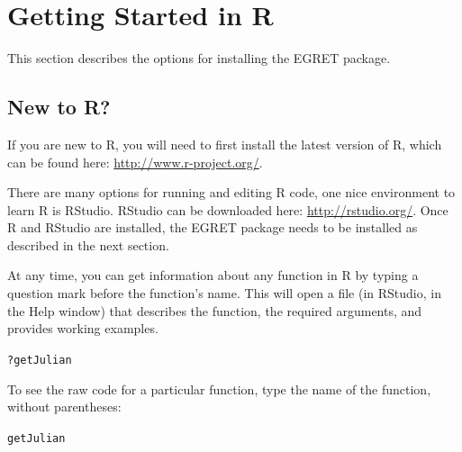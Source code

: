 \documentclass[a4paper,11pt]{article}\usepackage[]{graphicx}\usepackage[]{color}
\makeatletter
\newcommand{\hlopt}[1]{\textcolor[rgb]{0,0,0}{#1}}%
\newcommand{\hlstd}[1]{\textcolor[rgb]{0.345,0.345,0.345}{#1}}%
\newenvironment{kframe}{%
 \def\at@end@of@kframe{}%
 \ifinner\ifhmode%
  \def\at@end@of@kframe{\end{minipage}}%
  \begin{minipage}{\columnwidth}%
 \fi\fi%
 \def\FrameCommand##1{\hskip\@totalleftmargin \hskip-\fboxsep
 \colorbox{shadecolor}{##1}\hskip-\fboxsep
     \hskip-\linewidth \hskip-\@totalleftmargin \hskip\columnwidth}%
 \MakeFramed {\advance\hsize-\width
   \@totalleftmargin\z@ \linewidth\hsize
   \@setminipage}}%
 {\par\unskip\endMakeFramed%
 \at@end@of@kframe}
\newenvironment{knitrout}{}{} %
\makeatother
\begin{document}
\FloatBarrier


\section{Getting Started in R}
\label{sec:appendix1}
This section describes the options for installing the EGRET package.

\subsection{New to R?}
If you are new to R, you will need to first install the latest version of R, which can be found here: \url{http://www.r-project.org/}.

There are many options for running and editing R code, one nice environment to learn R is RStudio. RStudio can be downloaded here: \url{http://rstudio.org/}. Once R and RStudio are installed, the EGRET package needs to be installed as described in the next section.

At any time, you can get information about any function in R by typing a question mark before the function's name.  This will open a file (in RStudio, in the Help window) that describes the function, the required arguments, and provides working examples.

\begin{knitrout}
\color{fgcolor}\begin{kframe}
\begin{alltt}
\hlopt{?}\hlstd{getJulian}
\end{alltt}
\end{kframe}
\end{knitrout}

To see the raw code for a particular function, type the name of the function, without parentheses:
\begin{knitrout}
\color{fgcolor}\begin{kframe}
\begin{alltt}
\hlstd{getJulian}
\end{alltt}
\end{kframe}
\end{knitrout}
\end{document}
